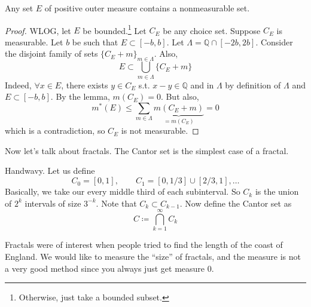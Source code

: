   \begin{theorem}
    Any set $E$ of positive outer measure contains a nonmeasurable set. 
  \end{theorem}
  \begin{proof}
    WLOG, let $E$ be bounded.\footnote{Otherwise, just take a bounded subset.} Let $C_E$ be any choice set. Suppose $C_E$ is measurable. Let $b$ be such that $E \subset [-b, b]$. Let $\Lambda = \mathbb{Q} \cap [-2b, 2b]$. Consider the disjoint family of sets $\{C_E + m\}_{m\in \Lambda}$. Also, 
    \begin{equation}
      E \subset \bigcup_{m\in \Lambda} \{ C_E + m\}
    \end{equation}
    Indeed, $\forall x \in E$, there exists $y \in C_E$ s.t. $x - y \in \mathbb{Q}$ and in $\Lambda$ by definition of $\Lambda$ and $E \subset [-b, b]$. By the lemma, $m(C_E) = 0$. But also, 
    \begin{equation}
      m^\ast (E) \leq \sum_{m\in \Lambda} \underbrace{m(C_E + m)}_{= m(C_E)} = 0
    \end{equation}
    which is a contradiction, so $C_E$ is not measurable. 
  \end{proof}

  Now let's talk about fractals. The Cantor set is the simplest case of a fractal. 

  \begin{definition}
    Handwavy. Let us define 
    \begin{equation}
      C_0 = [0, 1], \qquad C_1 = [0, 1/3] \cup [2/3, 1], \ldots
    \end{equation}
    Basically, we take our every middle third of each subinterval. So $C_k$ is the union of $2^k$ intervals of size $3^{-k}$. Note that $C_k \subset C_{k-1}$. Now define the Cantor set as 
    \begin{equation}
      C \coloneqq \bigcap_{k=1}^\infty C_k
    \end{equation}
  \end{definition}

  Fractals were of interest when people tried to find the length of the coast of England. We would like to measure the ``size'' of fractals, and the measure is not a very good method since you always just get measure $0$. 

